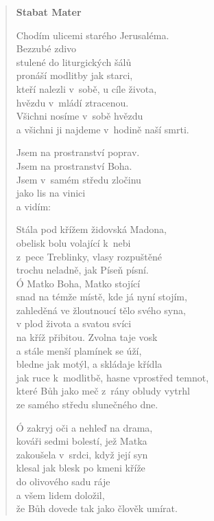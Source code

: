 \begin{verse}
\bigskip

\textbf{Stabat Mater}

\medskip

Chodím ulicemi starého Jerusaléma. \\
Bezzubé zdivo \\
stulené do liturgických šálů \\
pronáší modlitby jak starci, \\
kteří nalezli v sobě, u cíle života, \\
hvězdu v mládí ztracenou. \\
Všichni nosíme v sobě hvězdu \\
a všichni ji najdeme v hodině naší smrti. 

\medskip

Jsem na prostranství poprav. \\
Jsem na prostranství Boha. \\
Jsem v samém středu zločinu \\
jako lis na vinici \\
a vidím: 

\medskip

Stála pod křížem židovská Madona, \\
obelisk bolu volající k nebi \\
z pece Treblinky, vlasy rozpuštěné \\
trochu neladně, jak Píseň písní. \\
Ó Matko Boha, Matko stojící \\
snad na témže místě, kde já nyní stojím, \\
zahleděná ve žloutnoucí tělo svého syna, \\
v plod života a svatou svíci \\
na kříž přibitou. Zvolna taje vosk \\
a stále menší plamínek se úží, \\
bledne jak motýl, a skládaje křídla \\
jak ruce k modlitbě, hasne vprostřed temnot, \\
které Bůh jako meč z rány obludy vytrhl \\
ze samého středu slunečného dne.

\medskip

Ó zakryj oči a nehleď na drama, \\
kováři sedmi bolestí, jež Matka \\
zakoušela v srdci, když její syn \\
klesal jak blesk po kmeni kříže \\
do olivového sadu ráje \\
a všem lidem doložil, \\
že Bůh dovede tak jako člověk umírat.


\end{verse}
